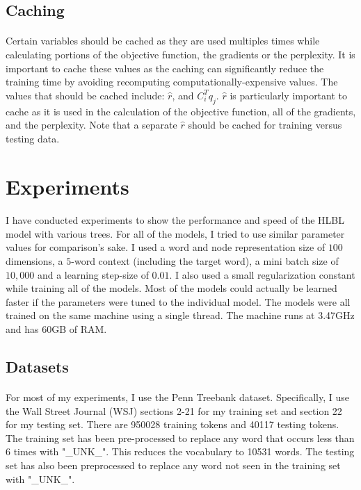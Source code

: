 \subsection{Caching}
\paragraph{}
Certain variables should be cached as they are used multiples times while calculating portions of the objective function, the gradients or the perplexity. It is important to cache these values as the caching can significantly reduce the training time by avoiding recomputing computationally-expensive values. The values that should be cached include: $\hat{r}$, and $C_i^T q_j$. $\hat{r}$ is particularly important to cache as it is used in the calculation of the objective function, all of the gradients, and the perplexity. Note that a separate $\hat{r}$ should be cached for training versus testing data.

\section{Experiments} \label{sec:experiments}
\paragraph{}
I have conducted experiments to show the performance and speed of the HLBL model with various trees. For all of the models, I tried to use similar parameter values for comparison's sake. I used a word and node representation size of $100$ dimensions, a $5$-word context (including the target word), a mini batch size of $10,000$ and a learning step-size of $0.01$. I also used a small regularization constant while training all of the models. Most of the models could actually be learned faster if the parameters were tuned to the individual model. The models were all trained on the same machine using a single thread. The machine runs at 3.47GHz and has 60GB of RAM.

\subsection{Datasets}
\paragraph{}
For most of my experiments, I use the Penn Treebank dataset. Specifically, I use the Wall Street Journal (WSJ) sections 2-21 for my training set and section 22 for my testing set. There are 950028 training tokens and 40117 testing tokens. The training set has been pre-processed to replace any word that occurs less than 6 times with "\_UNK\_". This reduces the vocabulary to 10531 words. The testing set has also been preprocessed to replace any word not seen in the training set with "\_UNK\_".
